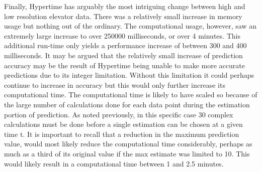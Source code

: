 \begin{center}
Finally, Hypertime has arguably the most intriguing change between high and low
resolution elevator data. There was a relatively small increase in memory usage
but nothing out of the ordinary. The computational usage, however, saw an
extremely large increase to over 250000 milliseconds, or over 4 minutes. This
additional run-time only yields a performance increase of between 300 and 400
milliseconds. It may be argued that the relatively small increase of prediction
accuracy may be the result of Hypertime being unable to make more accurate
predictions due to its integer limitation. Without this limitation it could
perhaps continue to increase in accuracy but this would only further increase its
computational time. The computational time is likely to have scaled so because of
the large number of calculations done for each data point during the
estimation portion of prediction. As noted previously, in this specific case
30 complex calculations must be done before a single estimation can be chosen at
a given time t. It is important to recall that a reduction in the maximum
prediction value, would most likely reduce the
computational time considerably, perhaps as much as a third of its original
value if the max estimate was limited to 10. This would likely result in a
computational time between 1 and 2.5 minutes. \\





\end{center}
